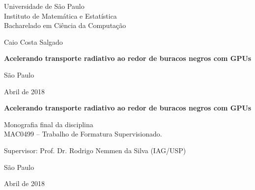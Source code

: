 \documentclass[12pt,twoside,a4paper]{book}
\begin{document}
\frontmatter
\fancyhead[RO]{{\footnotesize\rightmark}\hspace{2em}\thepage}
\setcounter{tocdepth}{2}
\fancyhead[LE]{\thepage\hspace{2em}\footnotesize{\leftmark}}
\fancyhead[RE,LO]{}
\fancyhead[RO]{{\footnotesize\rightmark}\hspace{2em}\thepage}

\onehalfspacing  %

\thispagestyle{empty}
\begin{center}
    \vspace*{2.3cm}
    Universidade de São Paulo\\
    Instituto de Matemática e Estatística\\
    Bacharelado em Ciência da Computação


    \vspace*{3cm}
    \Large{Caio Costa Salgado}


    \vspace{3cm}
    \textbf{\Large{Acelerando transporte radiativo ao redor de buracos negros com GPUs}}


    \vskip 5cm
    \normalsize{São Paulo}

    \normalsize{Abril de 2018}
\end{center}

%
\newpage
\thispagestyle{empty}
  \begin{center}
    \vspace*{2.3 cm}
    \textbf{\Large{Acelerando transporte radiativo ao redor de buracos negros com GPUs}}
    \vspace*{2 cm}
  \end{center}

  \vskip 2cm

  \begin{flushright}
    Monografia final da disciplina \\
    MAC0499 -- Trabalho de Formatura Supervisionado.
  \end{flushright}

  \vskip 5cm

  \begin{center}
    Supervisor: Prof. Dr. Rodrigo Nemmen da Silva (IAG/USP)

    \vskip 5cm
    \normalsize{São Paulo}

    \normalsize{Abril de 2018}
  \end{center}
\pagebreak
\end{document}
